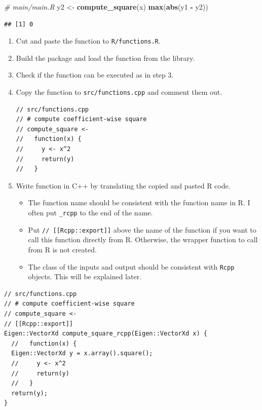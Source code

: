 \documentclass[]{book}
\newenvironment{Shaded}{\begin{snugshade}}{\end{snugshade}}
\newcommand{\KeywordTok}[1]{\textcolor[rgb]{0.13,0.29,0.53}{\textbf{#1}}}
\newcommand{\StringTok}[1]{\textcolor[rgb]{0.31,0.60,0.02}{#1}}
\newcommand{\CommentTok}[1]{\textcolor[rgb]{0.56,0.35,0.01}{\textit{#1}}}
\newcommand{\OperatorTok}[1]{\textcolor[rgb]{0.81,0.36,0.00}{\textbf{#1}}}
\newcommand{\NormalTok}[1]{#1}
\providecommand{\tightlist}{%
  \setlength{\itemsep}{0pt}\setlength{\parskip}{0pt}}
\begin{document}
\begin{Shaded}
\begin{Highlighting}[]
\CommentTok{# main/main.R}
\NormalTok{y2 <-}\StringTok{ }\KeywordTok{compute_square}\NormalTok{(x)}
\KeywordTok{max}\NormalTok{(}\KeywordTok{abs}\NormalTok{(y1 }\OperatorTok{-}\StringTok{ }\NormalTok{y2))}
\end{Highlighting}
\end{Shaded}

\begin{verbatim}
## [1] 0
\end{verbatim}

\begin{enumerate}
\def\labelenumi{\arabic{enumi}.}
\setcounter{enumi}{3}
\item
  Cut and paste the function to \texttt{R/functions.R}.
\item
  Build the package and load the function from the library.
\item
  Check if the function can be executed as in step 3.
\item
  Copy the function to \texttt{src/functions.cpp} and comment them out.

\begin{verbatim}
// src/functions.cpp
// # compute coefficient-wise square
// compute_square <-
//   function(x) {
//     y <- x^2
//     return(y)
//   }
\end{verbatim}
\item
  Write function in C++ by translating the copied and pasted R code.

  \begin{itemize}
  \tightlist
  \item
    The function name should be consistent with the function name in R.
    I often put \texttt{\_rcpp} to the end of the name.
  \item
    Put \texttt{//\ {[}{[}Rcpp::export{]}{]}} above the name of the
    function if you want to call this function directly from R.
    Otherwise, the wrapper function to call from R is not created.
  \item
    The class of the inputs and output should be consistent with
    \texttt{Rcpp} objects. This will be explained later.
  \end{itemize}
\end{enumerate}

\begin{verbatim}
// src/functions.cpp
// # compute coefficient-wise square
// compute_square <-
// [[Rcpp::export]]
Eigen::VectorXd compute_square_rcpp(Eigen::VectorXd x) {
  //   function(x) {
  Eigen::VectorXd y = x.array().square();
  //     y <- x^2
  //     return(y)
  //   }
  return(y);
}
\end{verbatim}
\end{document}

